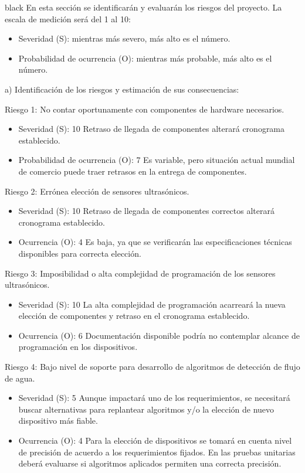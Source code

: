 \documentclass[
11pt, %
codirector, %
]{charter}
\begin{document}
\begin{consigna}{black}
En esta sección se identificarán y evaluarán los riesgos del proyecto. La escala de medición será del 1 al 10:
\begin{itemize}
	\item Severidad (S): mientras más severo, más alto es el número.\\
	\item Probabilidad de ocurrencia (O): mientras más probable, más alto es el número.\\
\end{itemize}   


a) Identificación de los riesgos y estimación de sus consecuencias:
 
Riesgo 1: No contar oportunamente con componentes de hardware necesarios.
\begin{itemize}
	\item Severidad (S): 10
	Retraso de llegada de componentes alterará cronograma establecido.
	\item Probabilidad de ocurrencia (O): 7
	Es variable, pero situación actual mundial de comercio puede traer retrasos en la entrega de componentes.
\end{itemize}   

Riesgo 2: Errónea elección de sensores ultrasónicos.
\begin{itemize}
	\item Severidad (S): 10
	Retraso de llegada de componentes correctos alterará cronograma establecido.
	\item Ocurrencia (O): 4
	Es baja, ya que se verificarán las especificaciones técnicas disponibles para correcta elección.
\end{itemize}

Riesgo 3: Imposibilidad o alta complejidad de programación de los sensores ultrasónicos.
\begin{itemize}
	\item Severidad (S): 10
	La alta complejidad de programación acarreará la nueva elección de componentes y retraso en el cronograma establecido.
	\item Ocurrencia (O): 6
	Documentación disponible podría no contemplar alcance de programación en los dispositivos.
\end{itemize}

Riesgo 4: Bajo nivel de soporte para desarrollo de algoritmos de detección de flujo de agua.
\begin{itemize}
	\item Severidad (S): 5
	Aunque impactará uno de los requerimientos, se necesitará buscar alternativas para replantear algoritmos y/o la elección de nuevo dispositivo más fiable.
	\item Ocurrencia (O): 4
	Para la elección de dispositivos se tomará en cuenta nivel de precisión de acuerdo a los requerimientos fijados. En las pruebas unitarias deberá evaluarse si algoritmos aplicados permiten una correcta precisión.
\end{itemize}


\end{consigna}
\end{document}
